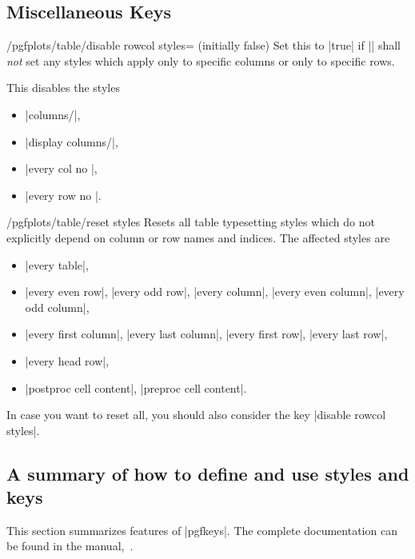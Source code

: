\documentclass[a4paper]{ltxdoc}
\begin{document}
\subsection{Miscellaneous Keys}

\begin{key}{/pgfplots/table/disable rowcol styles= (initially false)}
    Set this to |true| if |\pgfplotstabletypeset| shall \emph{not} set any
    styles which apply only to specific columns or only to specific rows.

    This disables the styles
    \begin{itemize}
        \item |columns/|,
        \item |display columns/|,
        \item |every col no |,
        \item |every row no |.
    \end{itemize}
\end{key}

\begin{key}{/pgfplots/table/reset styles}
    Resets all table typesetting styles which do not explicitly depend on
    column or row names and indices. The affected styles are
    \begin{itemize}
        \item |every table|,
        \item |every even row|, |every odd row|, |every column|,
            |every even column|, |every odd column|,
        \item |every first column|, |every last column|, |every first row|,
            |every last row|,
        \item |every head row|,
        \item |postproc cell content|, |preproc cell content|.
    \end{itemize}
    In case you want to reset all, you should also consider the key
    |disable rowcol styles|.
\end{key}


\subsection{A summary of how to define and use styles and keys}

This section summarizes features of |pgfkeys|. The complete documentation can
be found in the \pgfname{} manual,~\cite{tikz}.
\end{document}
